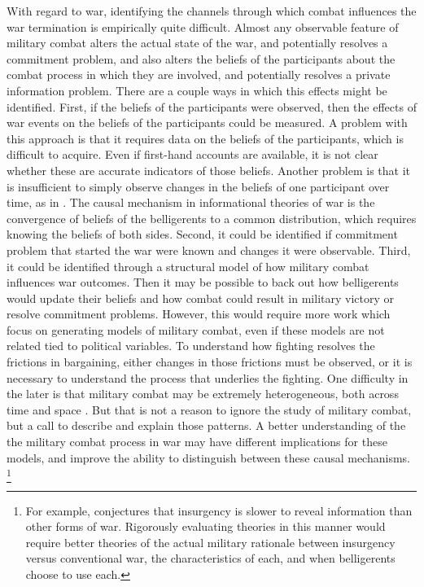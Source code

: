 With regard to war, identifying the channels through which combat influences the war termination is empirically quite difficult.
Almost any observable feature of military combat alters the actual state of the war, and potentially resolves a commitment problem, and also alters the beliefs of the participants about the combat process in which they are involved, and potentially resolves a private information problem.
There are a couple ways in which this effects might be identified. %
First, if the beliefs of the participants were observed, then the effects of war events on the beliefs of the participants could be measured. %
A problem with this approach is that it requires data on the beliefs of the participants, which is difficult to acquire.
Even if first-hand accounts are available, it is not clear whether these are accurate indicators of those beliefs. %
Another problem is that it is insufficient to simply observe changes in the beliefs of one participant over time, as in \textcite{Reiter2009}. %
The causal mechanism in informational theories of war is the convergence of beliefs of the belligerents to a common distribution, which requires knowing the beliefs of both sides.
Second, it could be identified if commitment problem that started the war were known and changes it were observable. 
Third, it could be identified through a structural model of how military combat influences war outcomes.
Then it may be possible to back out how belligerents would update their beliefs and how combat could result in military victory or resolve commitment problems.
However, this would require more work which focus on generating models of military combat, even if these models are not related tied to political variables.
To understand how fighting resolves the frictions in bargaining, either changes in those frictions must be observed, or it is necessary to understand the process that underlies the fighting. %
One  difficulty in the later is that  military combat may be extremely heterogeneous, both across time and space \parencite{Reiter2003}.
But that is not a reason to ignore the study of military combat, but a call to describe and explain those patterns.
A better understanding of the the military combat process in war may have different implications for these models, and improve the ability to distinguish between these causal mechanisms.%
\footnote{%
  For example, \textcite{Walter2009} conjectures that insurgency is slower to reveal information than other forms of war. %
  Rigorously evaluating theories in this manner would require better theories of the actual military rationale between insurgency versus conventional war, the characteristics of each, and when belligerents choose to use each.
}



